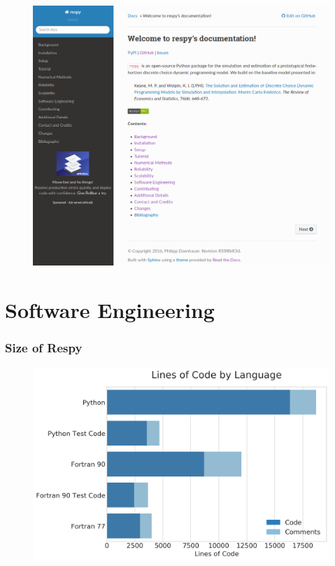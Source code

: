 \documentclass[11pt]{beamer}
\begin{document}
\begin{frame}
    \begin{figure}
      \includegraphics[height=\textheight]{../graphs/respy_rtd.png}
    \end{figure}
\end{frame}




\section{Software Engineering}


\begin{frame}[c]\frametitle{Size of Respy}
    \begin{figure}
      \includegraphics[width=\textwidth]{../../cloc/lines_of_code_by_language.png}
    \end{figure}
\end{frame}
\end{document}
